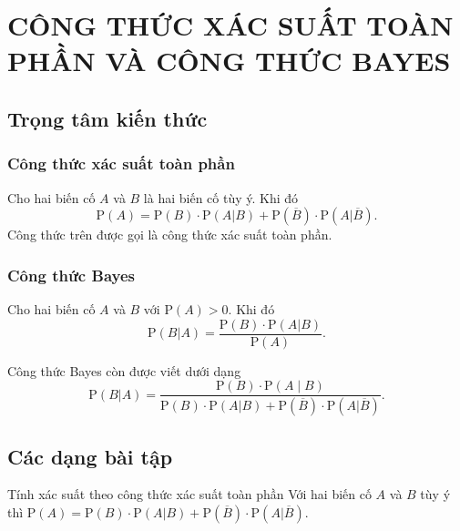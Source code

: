 ﻿\setcounter{section}{1}
\section{CÔNG THỨC XÁC SUẤT TOÀN PHẦN VÀ CÔNG THỨC BAYES}
\subsection{Trọng tâm kiến thức}
\begin{tomtat}
\subsubsection{Công thức xác suất toàn phần}
\begin{boxdn}
Cho hai biến cố $A$ và $B$ là hai biến cố tùy ý. Khi đó
$$\mathrm{P}(A)=\mathrm{P}(B)\cdot \mathrm{P}(A|B)+\mathrm{P}(\overline{B})\cdot \mathrm{P}(A|\overline{B}).$$
Công thức trên được gọi là công thức xác suất toàn phần.
\end{boxdn}
\subsubsection{Công thức Bayes}
\begin{boxdn}
Cho hai biến cố $A$ và $B$ với $\mathrm{P}(A)>0$. Khi đó
$$\mathrm{P}\left(B|A\right)=\dfrac{\mathrm{P}(B)\cdot\mathrm{P}\left(A|B\right)}{\mathrm{P}(A)}.$$
\end{boxdn}
\begin{note}
Công thức Bayes còn được viết dưới dạng 
$$\mathrm{P}(B | A)=\dfrac{\mathrm{P}(B) \cdot \mathrm{P}(A \mid B)}{\mathrm{P}(B)\cdot \mathrm{P}(A | B)+\mathrm{P}\left(\overline{B}\right)\cdot \mathrm{P}\left(A | \overline{B}\right)}.$$
\end{note}
\end{tomtat}
\subsection{Các dạng bài tập}
\setcounter{dang}{0}
\begin{dang}{Tính xác suất theo công thức xác suất toàn phần}
	Với hai biến cố $A$ và $B$ tùy ý thì
	$\mathrm{P}(A)=\mathrm{P}(B)\cdot\mathrm{P}(A|B)+\mathrm{P}(\overline{B})\cdot\mathrm{P}(A|\overline{B}).$
\end{dang}

